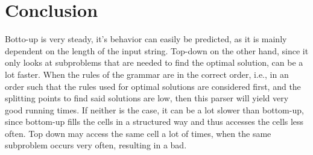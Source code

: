 \section{Conclusion}


Botto-up is very steady, it's behavior can easily be predicted, as it is mainly dependent on the length of the input string.
Top-down on the other hand, since it only looks at subproblems that are needed to find the optimal solution, can be a lot faster.
When the rules of the grammar are in the correct order, i.e., in an order such that the rules used for optimal solutions are considered first, and the splitting points to find said solutions are low, then this parser will yield very good running times.
If neither is the case, it can be a lot slower than bottom-up, since bottom-up fills the cells in a structured way and thus accesses the cells less often.
Top down may access the same cell a lot of times, when the same subproblem occurs very often, resulting in a bad.


